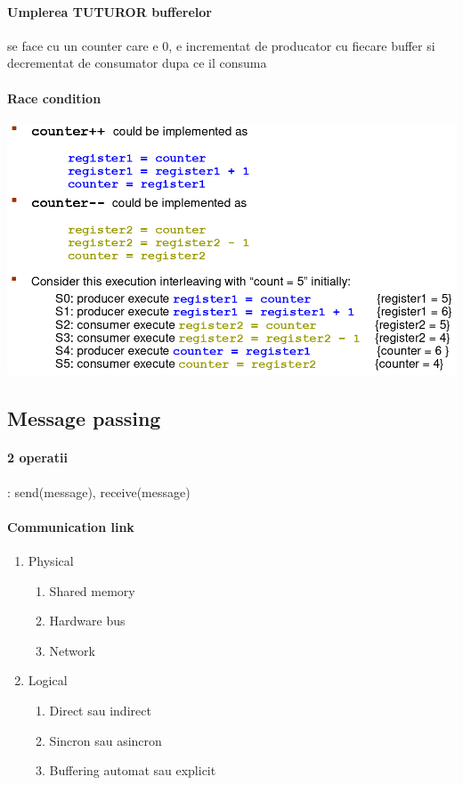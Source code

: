 \documentclass{article}
\begin{document}
\paragraph*{Umplerea TUTUROR bufferelor} se face cu un counter care e 0, e incrementat de producator cu fiecare buffer si decrementat de consumator dupa ce il consuma

\paragraph*{Race condition}

\begin{center}
    \includegraphics[scale=0.3]{6_racecondition.png}
\end{center}


\subsection*{Message passing}
\paragraph*{2 operatii}: send(message), receive(message)
\paragraph*{Communication link}
\begin{enumerate}
    \item Physical
          \begin{enumerate}
              \item Shared memory
              \item Hardware bus
              \item Network
          \end{enumerate}
    \item Logical
          \begin{enumerate}
              \item Direct sau indirect
              \item Sincron sau asincron
              \item Buffering automat sau explicit
          \end{enumerate}
\end{enumerate}
\end{document}
